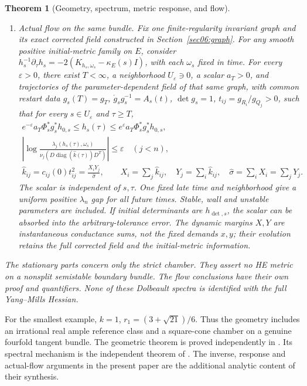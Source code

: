 \documentclass[11pt]{amsart}
\newtheorem{theorem}{Theorem}[section]
\theoremstyle{definition}
\theoremstyle{remark}
\newcommand{\diag}{\operatorname{diag}}
\begin{document}
\begin{theorem}[Geometry, spectrum, metric response, and flow]
\begin{enumerate}
\item \emph{Actual flow on the same bundle.}
Fix one finite-regularity invariant graph and its exact corrected
field constructed in Section~\ref{sec06:graph}. For any smooth
positive initial-metric family on \(E\), consider
\(h_s^{-1}\partial_\tau h_s=-2(K_{h_s,\omega_s}-\kappa_E(s)I)\),
with each \(\omega_s\) fixed in time. For every
\(\varepsilon>0\), there exist \(T<\infty\), a neighborhood
\(U_\varepsilon\ni0\), a scalar \(a_T>0\), and trajectories of
the parameter-dependent field of that same graph, with common restart
data \(g_s(T)=g_T\), \(\dot g_sg_s^{-1}=A_s(t)\),
\(\det g_s=1\), \(t_{ij}=g_{R_i}/g_{Q_j}>0\), such that for
every \(s\in U_\varepsilon\) and \(\tau\ge T\),
\begin{equation}\label{eq01:familyflow}
 \begin{gathered}
 e^{-\varepsilon}a_T\Phi_s^*g_s^*h_{0,s}
     \le h_s(\tau)\le e^{\varepsilon}a_T\Phi_s^*g_s^*h_{0,s},\\
 \left|\log\frac{\lambda_j(h_s(\tau),\omega_s)}
               {\nu_j(D\diag(\widehat k(\tau))D^T)}\right|
       \le\varepsilon\quad(j<n),\\
 \widehat k_{ij}=c_{ij}(0)t_{ij}^2
       =\frac{X_iY_j}{\widehat\sigma},\qquad
 X_i=\sum_j\widehat k_{ij},\quad Y_j=\sum_i\widehat k_{ij},
 \quad\widehat\sigma=\sum_iX_i=\sum_jY_j.
 \end{gathered}
\end{equation}
The scalar is independent of \(s,\tau\). One fixed late time and
neighborhood give a uniform positive \(\lambda_n\) gap for all
future times. Stable, wall and unstable parameters are included.
If initial determinants are \(h_{\det,s}\), the scalar can be
absorbed into the arbitrary-tolerance error. The dynamic margins
\(X,Y\) are instantaneous conductance sums, not the fixed
demands \(x,y\); their evolution retains the full corrected field
and the initial-metric information.
\end{enumerate}
The stationary parts concern only the strict chamber. They assert
no HE metric on a nonsplit semistable boundary bundle. The flow
conclusions have their own proof and quantifiers. None of these
Dolbeault spectra is identified with the full Yang--Mills Hessian.
\end{theorem}

For the smallest example, \(k=1\),
\(r_1=(3+\sqrt{21})/6\). Thus the geometry includes an irrational
real ample reference class and a square-cone chamber on a genuine
fourfold tangent bundle. The geometric theorem is proved independently
in \cite{wuebben2026realization}. Its spectral mechanism is the
independent theorem of \cite{wuebben2026uniform}. The inverse,
response and actual-flow arguments in the present paper are the
additional analytic content of their synthesis.
\end{document}

